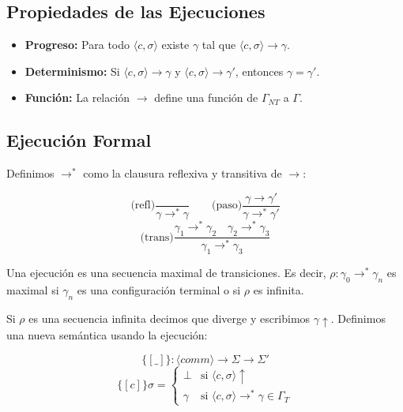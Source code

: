 \documentclass[a4paper,11pt]{article}
\begin{document}
\subsection{Propiedades de las Ejecuciones}

\begin{itemize}
    \item \textbf{Progreso:} Para todo $\langle c, \sigma \rangle$ existe $\gamma$ tal que $\langle c, \sigma \rangle \to \gamma$.
    \item \textbf{Determinismo:} Si $\langle c, \sigma \rangle \to \gamma$ y $\langle c, \sigma \rangle \to \gamma'$, entonces $\gamma = \gamma'$.
    \item \textbf{Función:} La relación $\to$ define una función de $\Gamma_{NT}$ a $\Gamma$.
\end{itemize}

\subsection{Ejecución Formal}

Definimos $\to^*$ como la clausura reflexiva y transitiva de $\to$:

\[
\text{(refl)} \frac{}{\gamma \to^* \gamma}
\qquad
\text{(paso)} \frac{\gamma \to \gamma'}{\gamma \to^* \gamma'}
\]
\[
\text{(trans)} \frac{\gamma_1 \to^* \gamma_2 \quad \gamma_2 \to^* \gamma_3}{\gamma_1 \to^* \gamma_3}
\]

Una ejecución es una secuencia maximal de transiciones. Es decir, $\rho : \gamma_0 \to^* \gamma_n$ es maximal si $\gamma_n$ es una configuración terminal o si $\rho$ es infinita.

Si $\rho$ es una secuencia infinita decimos que diverge y escribimos $\gamma \uparrow$. Definimos una nueva semántica usando la ejecución:

\[
\{\![\_]\!\} : \langle comm \rangle \to \Sigma \to \Sigma'
\]
\[
\{\![c]\!\} \sigma = 
\begin{cases} 
\perp & \text{si } \langle c, \sigma \rangle \uparrow \\
\gamma & \text{si } \langle c, \sigma \rangle \to^* \gamma \in \Gamma_T 
\end{cases}
\]
\end{document}
